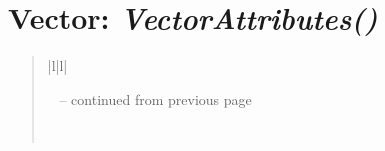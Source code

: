\documentclass[letterpaper,10pt,english]{sphinxmanual}
\begin{document}
\section{\textbf{Vector}: \emph{VectorAttributes()}}
\label{attributes:vector-vectorattributes}
\begin{DUlineblock}{0em}
\item[] 
\end{DUlineblock}
\begin{quote}

\begin{longtable}{|l|l|}
\hline
\endfirsthead

%
{{\textsf{\tablename\ \thetable{} -- continued from previous page}}} \\
\hline
\endhead

\hline {} \\ \hline
\endfoot

\endlastfoot



\end{longtable}
\end{quote}
\end{document}
